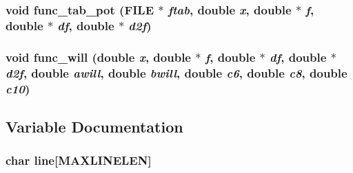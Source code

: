 \subsubsection{\setlength{\rightskip}{0pt plus 5cm}void func\_\-tab\_\-pot (FILE $\ast$ {\em ftab}, double {\em x}, double $\ast$ {\em f}, double $\ast$ {\em df}, double $\ast$ {\em d2f})}\label{energy_2inter_2md__funcvdw_8c_80ef4480b418d557b240d066da1f7b80}


\subsubsection{\setlength{\rightskip}{0pt plus 5cm}void func\_\-will (double {\em x}, double $\ast$ {\em f}, double $\ast$ {\em df}, double $\ast$ {\em d2f}, double {\em awill}, double {\em bwill}, double {\em c6}, double {\em c8}, double {\em c10})}\label{energy_2inter_2md__funcvdw_8c_ae40f1230fd286d227a7c624c6f0c81f}




\subsection{Variable Documentation}
\subsubsection{\setlength{\rightskip}{0pt plus 5cm}char {\bf line}[MAXLINELEN]}\label{energy_2inter_2md__funcvdw_8c_e229e1410053afa7afc569ee71be8eca}


